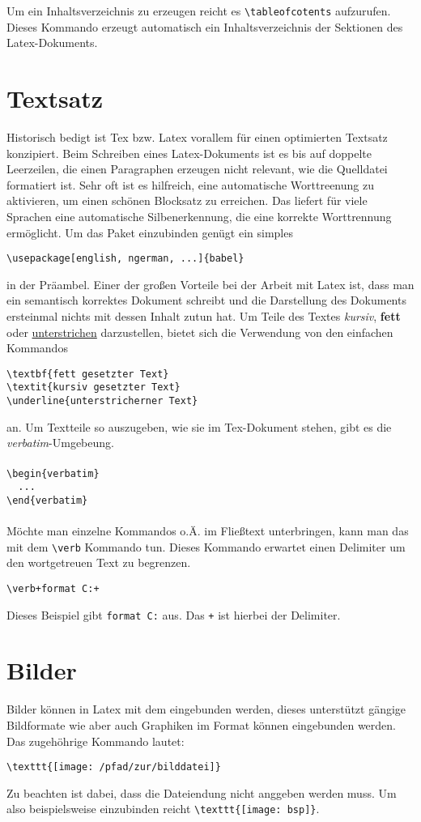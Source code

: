 Um ein Inhaltsverzeichnis zu erzeugen reicht es \verb+\tableofcotents+ aufzurufen. Dieses Kommando erzeugt
automatisch ein Inhaltsverzeichnis der Sektionen des Latex-Dokuments.

\section{Textsatz}
Historisch bedigt ist Tex bzw. Latex vorallem für einen optimierten Textsatz konzipiert. Beim Schreiben eines
Latex-Dokuments ist es bis auf doppelte Leerzeilen, die einen Paragraphen erzeugen nicht relevant, wie die
Quelldatei formatiert ist. Sehr oft ist es hilfreich, eine automatische Worttreenung zu aktivieren, um einen
schönen Blocksatz zu erreichen. Das  liefert für viele Sprachen eine automatische
Silbenerkennung, die eine korrekte Worttrennung ermöglicht. Um das Paket einzubinden genügt ein simples
\begin{verbatim}
\usepackage[english, ngerman, ...]{babel} 
\end{verbatim}
in der Präambel. Einer der großen Vorteile bei der Arbeit mit Latex ist, dass man ein semantisch korrektes
Dokument schreibt und die Darstellung des Dokuments ersteinmal nichts mit dessen Inhalt zutun hat. Um Teile
des Textes \textit{kursiv}, \textbf{fett} oder \underline{unterstrichen} darzustellen, bietet sich die Verwendung 
von den einfachen Kommandos 
\begin{verbatim}
\textbf{fett gesetzter Text}
\textit{kursiv gesetzter Text}
\underline{unterstricherner Text}
\end{verbatim}
an. Um Textteile so auszugeben, wie sie im Tex-Dokument stehen, gibt es die \textit{verbatim}-Umgebeung. 
\\ \\
\verb+\begin{verbatim}+\\
\verb+  ...+\\
\verb+\end{verbatim}+\\
\\
Möchte man einzelne Kommandos o.Ä. im Fließtext unterbringen, kann man das mit dem \verb+\verb+ Kommando tun.
Dieses Kommando erwartet einen Delimiter um den wortgetreuen Text zu begrenzen.
\begin{verbatim}
\verb+format C:+
\end{verbatim}
Dieses Beispiel gibt \verb+format C:+ aus. Das \verb#+# ist hierbei der Delimiter.

\section{Bilder}
Bilder können in Latex mit dem  eingebunden werden, dieses unterstützt gängige
Bildformate wie  aber auch Graphiken im  Format können eingebunden werden.
Das zugehöhrige Kommando lautet:
\begin{verbatim}
\texttt{[image: /pfad/zur/bilddatei]}
\end{verbatim}
Zu beachten ist dabei, dass die Dateiendung nicht anggeben werden muss. Um also beispielsweise 
einzubinden reicht \verb+\texttt{[image: bsp]}+.

